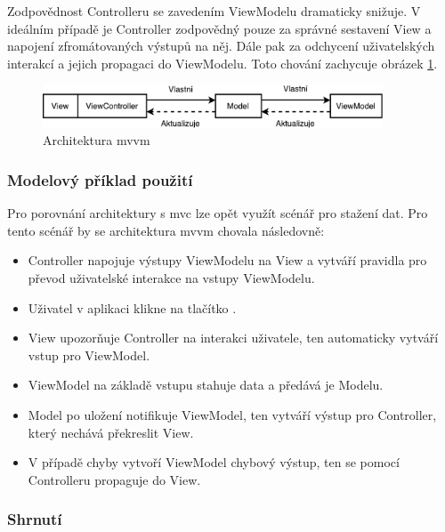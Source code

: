 
Zodpovědnost Controlleru se zavedením ViewModelu dramaticky snižuje.
V ideálním případě je Controller zodpovědný pouze za správné sestavení View a napojení zfromátovaných výstupů na něj.
Dále pak za odchycení uživatelských interakcí a jejich propagaci do ViewModelu.
Toto chování zachycuje obrázek \ref{architektura-mvvm}.

\begin{figure}\centering
	\includegraphics[width=0.9\textwidth]{assets/analysis-mvvm-architecture.pdf}
	\caption[Architektura \acrshort{mvvm}]{Architektura \acrshort{mvvm}}\label{architektura-mvvm}
\end{figure}

\subsubsection*{Modelový příklad použití} \label{architektura-mvvm-priklad}

Pro porovnání architektury s \acrshort{mvc} lze opět využít scénář pro stažení dat.
Pro tento scénář by se architektura \acrshort{mvvm} chovala následovně:
\begin{itemize}
  \item Controller napojuje výstupy ViewModelu na View a vytváří pravidla pro převod uživatelské interakce na vstupy ViewModelu.
  \item Uživatel v aplikaci klikne na tlačítko .
  \item View upozorňuje Controller na interakci uživatele, ten automaticky vytváří vstup pro ViewModel.
  \item ViewModel na základě vstupu stahuje data a předává je Modelu.
  \item Model po uložení notifikuje ViewModel, ten vytváří výstup pro Controller, který nechává překreslit View.
  \item V případě chyby vytvoří ViewModel chybový výstup, ten se pomocí Controlleru propaguje do View.
\end{itemize}

\subsubsection*{Shrnutí} \label{architektura-mvvm-shrnuti}

